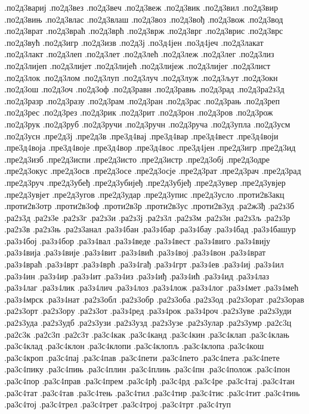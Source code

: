 {.по2д3вариј
.по2д3вез
.по2д3веч
.по2д3веж
.по2д3вик
.по2д3вил
.по2д3вир
.по2д3вињ
.по2д3влас
.по2д3влаш
.по2д3воз
.по2д3вођ
.по2д3вож
.по2д3вод
.по2д3врат
.по2д3враћ
.по2д3врћ
.по2д3врж
.по2д3врг
.по2д3врис
.по2д3врс
.по2д3вућ
.по2д3игр
.по2д3изв
.по2д3ј
.по3д4јен
.по3д4јеч
.по2д3лакат
.по2д3лакт
.по2д3леп
.по2д3лет
.по2д3лећ
.по2д3леж
.по2д3лег
.по2д3лиз
.по2д3лијеп
.по2д3лијет
.по2д3лијећ
.по2д3лијеж
.по2д3лијег
.по2д3лист
.по2д3лок
.по2д3лом
.по2д3луп
.по2д3луч
.по2д3луж
.по2д3љут
.по2д3окн
.по2д3ош
.по2д3оч
.по2д3оф
.по2д3равн
.по2д3равњ
.по2д3рад
.по2д3ра2з3д
.по2д3разр
.по2д3разу
.по2д3рам
.по2д3ран
.по2д3рас
.по2д3рањ
.по2д3реп
.по2д3рес
.по2д3рез
.по2д3рик
.по2д3рит
.по2д3рон
.по2д3ров
.по2д3рож
.по2д3рук
.по2д3руб
.по2д3ручи
.по2д3ручн
.по2д3руча
.по2д3упла
.по2д3усм
.по2д3усн
.пре2д3ј
.пре2д3в
.пре3д4вај
.пре3д4вар
.пре3д4вест
.пре3д4воји
.пре3д4воја
.пре3д4воје
.пре3д4вор
.пре3д4вос
.пре3д4јен
.пре2д3игр
.пре2д3ид
.пре2д3изб
.пре2д3испи
.пре2д3исто
.пре2д3истр
.пре2д3обј
.пре2д3одре
.пре2д3окус
.пре2д3осв
.пре2д3осе
.пре2д3осје
.пре2д3рат
.пре2д3рач
.пре2д3рад
.пре2д3руч
.пре2д3убеђ
.пре2д3убијеђ
.пре2д3убјеђ
.пре2д3увер
.пре2д3увјер
.пре2д3увјет
.пре2д3угов
.пре2д3удар
.пре2д3упис
.пре2д3усло
.проти2в3акц
.проти2в3отр
.проти2в3оф
.проти2в3р
.проти2в3ус
.проти2в3уд
.ра2ж3ђ
.ра2з3б
.ра2з3д
.ра2з3е
.ра2з3г
.ра2з3и
.ра2з3ј
.ра2з3л
.ра2з3м
.ра2з3н
.ра2з3љ
.ра2з3р
.ра2з3в
.ра2з3њ
.ра2з3анал
.ра3з4бан
.ра3з4бар
.ра3з4бау
.ра3з4бад
.ра3з4башур
.ра3з4бој
.ра3з4бор
.ра3з4вал
.ра3з4веде
.ра3з4вест
.ра3з4виго
.ра3з4вију
.ра3з4вија
.ра3з4вије
.ра3з4вит
.ра3з4вић
.ра3з4вој
.ра3з4вон
.ра3з4врат
.ра3з4враћ
.ра3з4врт
.ра3з4врћ
.ра3з4гађ
.ра3з4грт
.ра3з4ев
.ра3з4иј
.ра3з4ил
.ра3з4ин
.ра3з4ир
.ра3з4ит
.ра3з4из
.ра3з4иђ
.ра3з4ић
.ра3з4ид
.ра3з4лаз
.ра3з4лаг
.ра3з4лик
.ра3з4лич
.ра3з4лоз
.ра3з4лож
.ра3з4лог
.ра3з4мет
.ра3з4мећ
.ра3з4мрск
.ра3з4нат
.ра2з3обл
.ра2з3обр
.ра2з3оба
.ра2з3од
.ра2з3орат
.ра2з3орав
.ра2з3орт
.ра2з3ору
.ра2з3от
.ра3з4ред
.ра3з4рок
.ра3з4роч
.ра2з3уве
.ра2з3уди
.ра2з3уда
.ра2з3удб
.ра2з3узи
.ра2з3узд
.ра2з3узе
.ра2з3улар
.ра2з3умр
.ра2с3ц
.ра2с3к
.ра2с3п
.ра2с3т
.ра3с4как
.ра3с4канд
.ра3с4кин
.ра3с4клап
.ра3с4клањ
.ра3с4клад
.ра3с4клон
.ра3с4клопи
.ра3с4клопљ
.ра3с4клопа
.ра3с4кош
.ра3с4кроп
.ра3с4пај
.ра3с4пав
.ра3с4пети
.ра3с4пето
.ра3с4пета
.ра3с4пете
.ра3с4пику
.ра3с4пињ
.ра3с4плин
.ра3с4плињ
.ра3с4пн
.ра3с4полож
.ра3с4пон
.ра3с4пор
.ра3с4прав
.ра3с4прем
.ра3с4рђ
.ра3с4рд
.ра3с4ре
.ра3с4тај
.ра3с4тан
.ра3с4тат
.ра3с4тав
.ра3с4тењ
.ра3с4тил
.ра3с4тир
.ра3с4тис
.ра3с4тит
.ра3с4тињ
.ра3с4тој
.ра3с4трел
.ра3с4трет
.ра3с4трој
.ра3с4трт
.ра3с4туп
}
